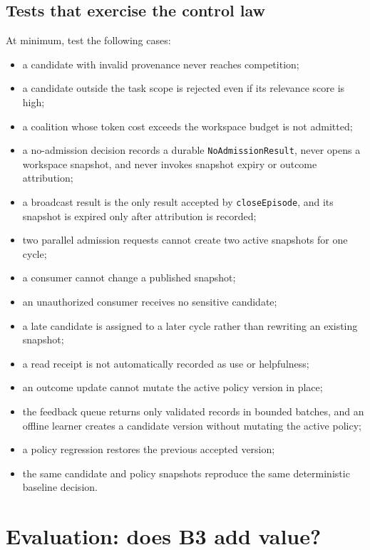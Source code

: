 \subsection{Tests that exercise the control law}

At minimum, test the following cases:
\begin{itemize}
  \item a candidate with invalid provenance never reaches competition;
  \item a candidate outside the task scope is rejected even if its relevance score is high;
  \item a coalition whose token cost exceeds the workspace budget is not admitted;
  \item a no-admission decision records a durable \texttt{NoAdmissionResult}, never opens a workspace snapshot, and never invokes snapshot expiry or outcome attribution;
  \item a broadcast result is the only result accepted by \texttt{closeEpisode}, and its snapshot is expired only after attribution is recorded;
  \item two parallel admission requests cannot create two active snapshots for one cycle;
  \item a consumer cannot change a published snapshot;
  \item an unauthorized consumer receives no sensitive candidate;
  \item a late candidate is assigned to a later cycle rather than rewriting an existing snapshot;
  \item a read receipt is not automatically recorded as use or helpfulness;
  \item an outcome update cannot mutate the active policy version in place;
  \item the feedback queue returns only validated records in bounded batches, and an offline learner creates a candidate version without mutating the active policy;
  \item a policy regression restores the previous accepted version;
  \item the same candidate and policy snapshots reproduce the same deterministic baseline decision.
\end{itemize}

\section{Evaluation: does B3 add value?}
\label{sec:ch14-evaluation}

